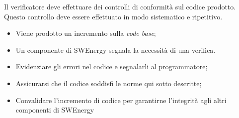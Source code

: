 \label{verifica-codice}

Il verificatore deve effettuare dei controlli di conformità sul codice
prodotto. Questo controllo deve essere effettuato in modo sistematico e
ripetitivo.

\begin{itemize}
	\item Viene prodotto un incremento sulla \textit{code base};

	\item Un componente di SWEnergy segnala la necessità di una verifica.
\end{itemize}

\begin{itemize}
	\item Evidenziare gli errori nel codice e segnalarli al programmatore;

	\item Assicurarsi che il codice soddisfi le norme qui sotto descritte;

	\item Convalidare l'incremento di codice per garantirne l'integrità agli
	      altri componenti di SWEnergy
\end{itemize}

